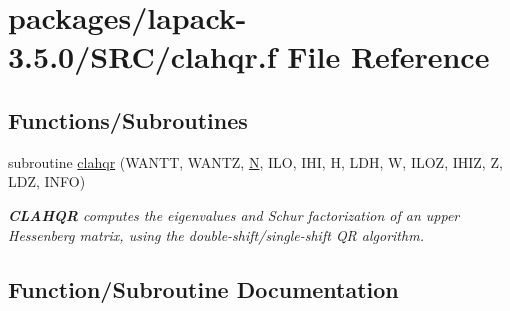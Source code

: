\hypertarget{lapack-3_85_80_2SRC_2clahqr_8f}{}\section{packages/lapack-\/3.5.0/\+S\+R\+C/clahqr.f File Reference}
\label{lapack-3_85_80_2SRC_2clahqr_8f}
\subsection*{Functions/\+Subroutines}
\begin{DoxyCompactItemize}
\item 
subroutine \hyperlink{lapack-3_85_80_2SRC_2clahqr_8f_adcbbd5854890ff535070cb8477b9dfb6}{clahqr} (W\+A\+N\+T\+T, W\+A\+N\+T\+Z, \hyperlink{polmisc_8c_a0240ac851181b84ac374872dc5434ee4}{N}, I\+L\+O, I\+H\+I, H, L\+D\+H, W, I\+L\+O\+Z, I\+H\+I\+Z, Z, L\+D\+Z, I\+N\+F\+O)
\begin{DoxyCompactList}\small\item\em {\bfseries C\+L\+A\+H\+Q\+R} computes the eigenvalues and Schur factorization of an upper Hessenberg matrix, using the double-\/shift/single-\/shift Q\+R algorithm. \end{DoxyCompactList}\end{DoxyCompactItemize}


\subsection{Function/\+Subroutine Documentation}
\hypertarget{lapack-3_85_80_2SRC_2clahqr_8f_adcbbd5854890ff535070cb8477b9dfb6}{}
